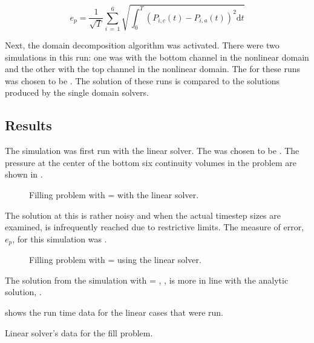 \begin{equation}
\label{eqn:vpmPressureError}
e_{p} =  \frac{1}{\sqrt{T}} \sum_{i\,=\,1}^{6}\sqrt{\int_{0}^{T} \left(P_{i,c}(t) - P_{i,a}(t)\right)^{2} \mathrm{d} t}
\end{equation}

Next, the domain decomposition algorithm was activated.
There were two simulations in this run: one was with the bottom channel in the nonlinear domain and the other with the top channel in the nonlinear domain.
The \dtmax{} for these runs was chosen to be .
The solution of these runs is compared to the solutions produced by the single domain solvers.

\subsection{Results}
\label{subsect:vmpResults}

The simulation was first run with the linear solver.
The \dtmax{} was chosen to be .
The pressure at the center of the bottom six continuity volumes in the problem are shown in .

\begin{figure}[h!t]
\centering

\caption{Filling problem with \dtmax{} =  with the linear solver.}
\label{fig:linFill1em1}
\end{figure}

The solution at this \dtmax{} is rather noisy and when the actual timestep sizes are examined, \dtmax{} is infrequently reached due to restrictive \dtcrnt{} limits.
The measure of error, $e_{p}$, for this simulation was .

\begin{figure}[h!t]
\centering

\caption{Filling problem with \dtmax{} =  using the linear solver.}
\label{fig:vmpLinFill5em2}
\end{figure}

The solution from the simulation with \dtmax{} = , , is more in line with the analytic solution, .

 shows the run time data for the linear cases that were run.

\begin{table}[ht]
\centering
\singlespace

\caption{Linear solver's data for the fill problem.}
\label{tab:vmpLinRunTime}
\end{table}


